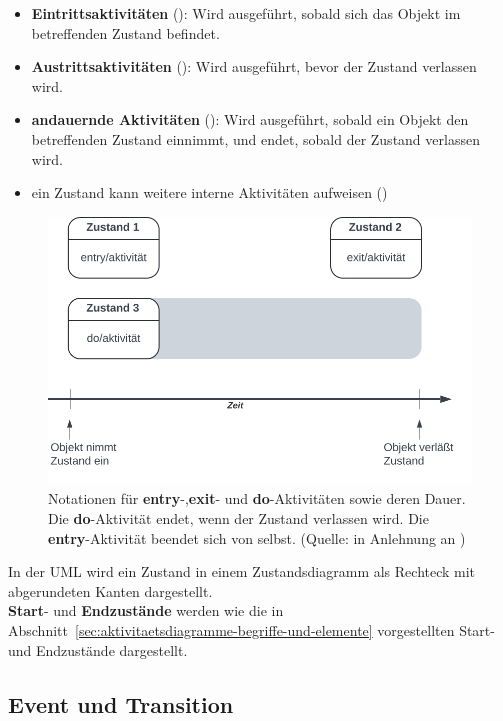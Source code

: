 \begin{itemize}
    \item \textbf{Eintrittsaktivitäten} (): Wird ausgeführt, sobald sich das Objekt im betreffenden Zustand befindet.
    \item \textbf{Austrittsaktivitäten} (): Wird ausgeführt, bevor der Zustand verlassen wird.
    \item \textbf{andauernde Aktivitäten} (): Wird ausgeführt, sobald ein Objekt den betreffenden Zustand einnimmt, und endet, sobald der Zustand verlassen wird.
    \item ein Zustand kann weitere interne Aktivitäten aufweisen (\cite[69]{Buh09})
\end{itemize}

\begin{figure}
    \centering
    \includegraphics[scale=0.4]{part three/Zustandsautomaten/img/entryexitdo}
    \caption{Notationen für \textbf{entry}-,\textbf{exit}- und \textbf{do}-Aktivitäten sowie deren Dauer. Die \textbf{do}-Aktivität endet, wenn der Zustand verlassen wird. Die \textbf{entry}-Aktivität beendet sich von selbst. (Quelle: in Anlehnung an \cite[89, Abb. 2.11-3]{Bal05})}
    \label{fig:entryexitdo}
\end{figure}

\noindent
In der UML wird ein Zustand in einem Zustandsdiagramm als Rechteck mit abgerundeten Kanten dargestellt.\\

\noindent
\textbf{Start}- und \textbf{Endzustände} werden wie die in Abschnitt~\ref{sec:aktivitaetsdiagramme-begriffe-und-elemente} vorgestellten Start- und Endzustände dargestellt.


\subsection{Event und Transition}

